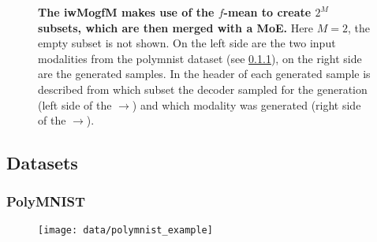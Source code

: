 \begin{figure}[h!]
    \centering
    \caption{\textbf{The iwMogfM makes use of the $f$-mean to create $2^M$ subsets, which are then merged with a MoE.} Here $M=2$, the empty subset is not shown. On the left side are the two input modalities from the polymnist dataset (see \cref{polymnist}), on the right side are the generated samples. In the header of each generated sample is described from which subset the decoder sampled for the generation (left side of the $\rightarrow$) and which modality was generated (right side of the $\rightarrow$).}
    \label{iwmogfmGraph}
\end{figure}

\subsection{Datasets}

\subsubsection{PolyMNIST} \label{polymnist}
\begin{figure}[h!]
    \centering
    \texttt{[image: data/polymnist\_example]}
\end{figure}